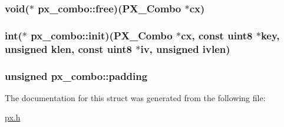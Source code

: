 \hypertarget{structpx__combo_a47f3f63a1e165cbb460cbba11b6abe1c}{
\subsubsection[{free}]{\setlength{\rightskip}{0pt plus 5cm}void($\ast$ px\-\_\-combo\-::free)({\bf P\-X\-\_\-\-Combo} $\ast$cx)}}\label{structpx__combo_a47f3f63a1e165cbb460cbba11b6abe1c}
\hypertarget{structpx__combo_a401b15c0ba6e9cd2ab90b32ea26645ef}{
\subsubsection[{init}]{\setlength{\rightskip}{0pt plus 5cm}int($\ast$ px\-\_\-combo\-::init)({\bf P\-X\-\_\-\-Combo} $\ast$cx, const {\bf uint8} $\ast$key, unsigned klen, const {\bf uint8} $\ast$iv, unsigned ivlen)}}\label{structpx__combo_a401b15c0ba6e9cd2ab90b32ea26645ef}
\hypertarget{structpx__combo_a253ba1f3900b1fdcf82ead9d1d5d5231}{
\subsubsection[{padding}]{\setlength{\rightskip}{0pt plus 5cm}unsigned px\-\_\-combo\-::padding}}\label{structpx__combo_a253ba1f3900b1fdcf82ead9d1d5d5231}


The documentation for this struct was generated from the following file\-:\begin{DoxyCompactItemize}
\item 
\hyperlink{px_8h}{px.\-h}\end{DoxyCompactItemize}

